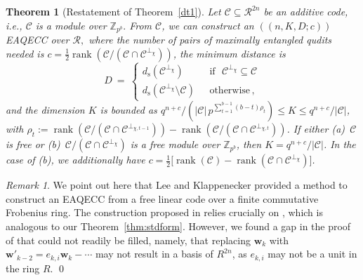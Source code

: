 \documentclass{article}
\DeclareMathOperator{\rank}{rank}
\newtheorem{thm}{Theorem}[section]
\theoremstyle{remark}
\newtheorem{rem}{Remark}[section]
\theoremstyle{definition}
\numberwithin{equation}{section}
\begin{document}
\begin{thm}[Restatement of Theorem~\ref{dt1}]  \label{thm:dt1_restate} 
Let $\mathcal{C} \subseteq \mathcal{R}^{2n}$ be an additive code,  i.e.,  $\mathcal{C}$ is a module over $\mathbb{Z}_{p^b}.$  From $\mathcal{C}$, we can construct an $((n,K, D; c))$ EAQECC over $\mathcal{R},$ where the number of pairs of maximally entangled qudits needed is $c = \frac12 \rank(\mathcal{C}/(\mathcal{C} \cap \mathcal{C}^{\perp_{{\chi}}}))$, the minimum distance is
\begin{equation*}
D~=~\left\{\begin{array}{ll}
d_{\mathrm{s}}(\mathcal{C}^{\perp_\chi}) & \text{~~if~~} \mathcal{C}^{\perp_\chi} \subseteq \mathcal{C} \\
d_{\mathrm{s}}(\mathcal{C}^{\perp_\chi}\setminus \mathcal{C}) & \text{~~otherwise} \, ,
\end{array}\right. 
\end{equation*}
and the dimension $K$ is bounded as $q^{n+c}/ (|\mathcal{C}| \, {p^{\sum_{t=1}^{b-1} (b-t)\rho_t}}) \leq  K \leq q^{n+c}/|\mathcal{C}|$, with $\rho_t:=\rank(\mathcal{C}/(\mathcal{C} \cap \mathcal{C}^{\perp_{\chi,t-1}}))-\rank(\mathcal{C}/(\mathcal{C} \cap \mathcal{C}^{\perp_{\chi,t}}))$. If either \emph{(a)}~$\mathcal{C}$ is free or \emph{(b)}~$\mathcal{C}/(\mathcal{C} \cap \mathcal{C}^{\perp_{\chi}})$ is a free module over $\mathbb{Z}_{p^b}$, then $K = q^{n+c}/|\mathcal{C}|$. In the case of \emph{(b)}, we additionally have $c=\frac12 \bigl[\rank(\mathcal{C}) - \rank(\mathcal{C} \cap \mathcal{C}^{\perp_\chi})\bigr]$.
\end{thm}
 
\begin{rem}  \label{rem:lee_klapp} We point out here that Lee and Klappenecker \cite[Proposition 2]{lee} provided a method to construct an EAQECC from a free linear code over a finite commutative Frobenius ring. The construction proposed in \cite[Proposition 2]{lee} relies crucially on \cite[Theorem 5]{lee}, which is analogous to our Theorem~\ref{thm:stdform}. However, we found a gap in the proof of \cite[Theorem 5]{lee} that could not readily be filled, namely, that replacing $\mathbf{w}_k$ with $\mathbf{w}'_{k-2} = e_{k,i} \mathbf{w}_k - \cdots $ may not result in a basis of $R^{2n}$, as $e_{k,i}$ may not be a unit in the ring $R$. \qed
\end{rem}
\end{document}
